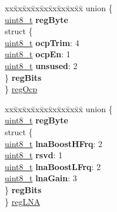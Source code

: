 \begin{DoxyCompactItemize}
\begin{tabbing}
\end{tabbing}\item 
\begin{tabbing}
xx\=xx\=xx\=xx\=xx\=xx\=xx\=xx\=xx\=\kill
union \{\\
\>\hyperlink{vl53l0x__types_8h_aba7bc1797add20fe3efdf37ced1182c5}{uint8\_t} {\bfseries regByte}\\
\>struct \{\\
\>\>\hyperlink{vl53l0x__types_8h_aba7bc1797add20fe3efdf37ced1182c5}{uint8\_t} {\bfseries ocpTrim}: 4\\
\>\>\hyperlink{vl53l0x__types_8h_aba7bc1797add20fe3efdf37ced1182c5}{uint8\_t} {\bfseries ocpEn}: 1\\
\>\>\hyperlink{vl53l0x__types_8h_aba7bc1797add20fe3efdf37ced1182c5}{uint8\_t} {\bfseries unsused}: 2\\
\>\} {\bfseries regBits}\\
\} \hyperlink{structFSK__Register__Map_a0d9a922f0d94fe3b4be0ca67635e3877}{regOcp}\\

\end{tabbing}\item 
\begin{tabbing}
xx\=xx\=xx\=xx\=xx\=xx\=xx\=xx\=xx\=\kill
union \{\\
\>\hyperlink{vl53l0x__types_8h_aba7bc1797add20fe3efdf37ced1182c5}{uint8\_t} {\bfseries regByte}\\
\>struct \{\\
\>\>\hyperlink{vl53l0x__types_8h_aba7bc1797add20fe3efdf37ced1182c5}{uint8\_t} {\bfseries lnaBoostHFrq}: 2\\
\>\>\hyperlink{vl53l0x__types_8h_aba7bc1797add20fe3efdf37ced1182c5}{uint8\_t} {\bfseries rsvd}: 1\\
\>\>\hyperlink{vl53l0x__types_8h_aba7bc1797add20fe3efdf37ced1182c5}{uint8\_t} {\bfseries lnaBoostLFrq}: 2\\
\>\>\hyperlink{vl53l0x__types_8h_aba7bc1797add20fe3efdf37ced1182c5}{uint8\_t} {\bfseries lnaGain}: 3\\
\>\} {\bfseries regBits}\\
\} \hyperlink{structFSK__Register__Map_a07a3a4a108d6cce775cdc938a9837f87}{regLNA}\\


\end{tabbing}
\end{DoxyCompactItemize}
